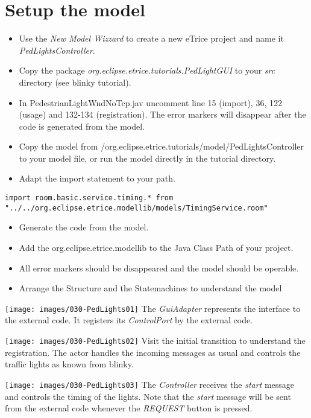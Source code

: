 \section{Setup the model}

\begin{itemize}
\item Use the \textit{New Model Wizzard} to create a new eTrice project and name it \textit{PedLightsController}.
\item Copy the package \textit{org.eclipse.etrice.tutorials.PedLightGUI} to your \textit{src} directory (see blinky tutorial).
\item In PedestrianLightWndNoTcp.jav uncomment line 15 (import), 36, 122 (usage) and 132-134 (registration). The error markers will disappear after the code is generated from the model.
\item Copy the model from /org.eclipse.etrice.tutorials/model/PedLightsController to your model file, or run the model directly in the tutorial directory. 
\item Adapt the import statement to your path.
\end{itemize}
\begin{verbatim} 
import room.basic.service.timing.* from "../../org.eclipse.etrice.modellib/models/TimingService.room" 
\end{verbatim}

\begin{itemize}
\item Generate the code from the model.
\item Add the org.eclipse.etrice.modellib to the Java Class Path of your project.
\item All error markers should be disappeared and the model should be operable. 
\item Arrange the Structure and the Statemachines to understand the model
\end{itemize}

\texttt{[image: images/030-PedLights01]}
The \textit{GuiAdapter} represents the interface to the external code. It registers its \textit{ControlPort} by the external code.

\texttt{[image: images/030-PedLights02]}
Visit the initial transition to understand the registration. The actor handles the incoming messages as usual and controls the traffic lights as known from blinky. 

\texttt{[image: images/030-PedLights03]}
The \textit{Controller} receives the \textit{start} message and controls the timing of the lights. Note that the \textit{start} message will be sent from the external code whenever the \textit{REQUEST} button is pressed.

